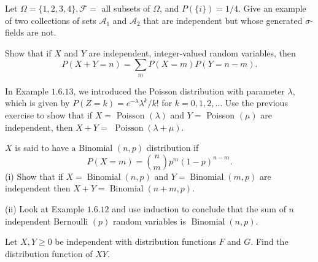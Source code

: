 \documentclass[en, normal, 11pt, black]{elegantnote}
\newenvironment{exercise}[1]{\begin{tcolorbox}[colback=black!15, colframe=black!80, breakable, title=#1]}{\end{tcolorbox}}
\begin{document}
    \begin{exercise}{2.1.9}
        Let $\Omega=\{1,2,3,4\}, \mathcal{F}=$ all subsets of $\Omega$, and $P(\{i\})=1 / 4$. Give an example of two collections of sets $\mathcal{A}_{1}$ and $\mathcal{A}_{2}$ that are independent but whose generated $\sigma$-fields are not. 
    \end{exercise}

    \begin{exercise}{2.1.10}
        Show that if $X$ and $Y$ are independent, integer-valued random variables, then
        \[
            P(X+Y=n)=\sum_{m} P(X=m) P(Y=n-m). 
        \]
    \end{exercise}

    \begin{exercise}{2.1.11}
        In Example $1.6 .13$, we introduced the Poisson distribution with parameter $\lambda$, which is given by $P(Z=k)=e^{-\lambda} \lambda^{k} / k !$ for $k=0,1,2, \ldots$ Use the previous exercise to show that if $X=$ Poisson $(\lambda)$ and $Y=$ Poisson $(\mu)$ are independent, then $X+Y=$ $\operatorname{Poisson}(\lambda+\mu)$. 
    \end{exercise}

    \begin{exercise}{2.1.12}
        $X$ is said to have a Binomial $(n, p)$ distribution if
        \[
            P(X=m)=\binom{n}{m}p^{m}(1-p)^{n-m}. 
        \]
    (i) Show that if $X=\operatorname{Binomial}(n, p)$ and $Y=\operatorname{Binomial}(m, p)$ are independent then $X+Y=\operatorname{Binomial}(n+m, p)$. 
    
    (ii) Look at Example $1.6 .12$ and use induction to conclude that the sum of $n$ independent Bernoulli $(p)$ random variables is $\operatorname{Binomial}(n, p)$. 
    \end{exercise}

    \begin{exercise}{2.1.14}
        Let $X, Y \geq 0$ be independent with distribution functions $F$ and $G$. Find the distribution function of $X Y$. 
    \end{exercise}
\end{document}

